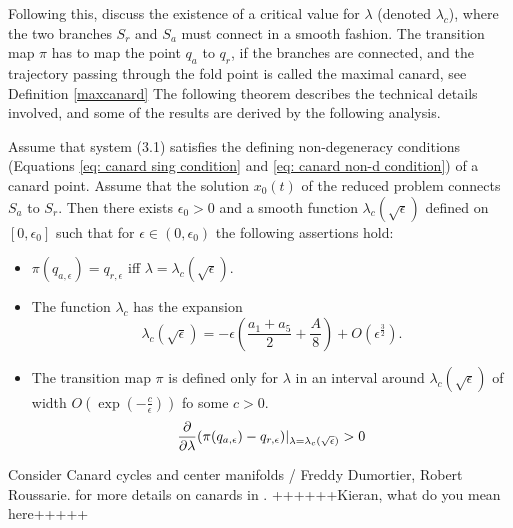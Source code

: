 Following this, \citet{krupa2001} discuss the existence of a critical value for $\lambda$ (denoted $\lambda_c$), where the two branches $S_r$ and $S_a$ must connect in a smooth fashion.  
The transition map $\pi$ has to map the point $q_a$ to $q_r$, if the branches are connected, and the trajectory passing through the fold point is called the maximal canard, see Definition \ref{maxcanard}
The following theorem describes the technical details involved, and some of the results are derived by the following analysis.
\begin{theorem}
	Assume that system (3.1) satisfies the defining non-degeneracy conditions (Equations \ref{eq: canard sing condition} and \ref{eq: canard non-d condition}) of a canard point. Assume that the solution $ x_0(t) $ of the reduced problem connects $ S_a $ to $ S_r $. Then there exists $ \epsilon_0 > 0 $ and a smooth function $\lambda_c(\sqrt{\epsilon})$ defined on $ [0, \epsilon_0] $ such that for $\epsilon \in (0, \epsilon_0)$ the following assertions hold:
	\begin{itemize}
		\item $ \pi(q_{a,\epsilon})=q_{r,\epsilon} $ iff $ \lambda=\lambda_c(\sqrt{\epsilon}) $.\\
		\item The function $ \lambda_c $ has the expansion
		 \begin{equation*}
			\lambda_c(\sqrt{\epsilon})=-\epsilon(\frac{a_1+a_5}{2}+\frac{A}{8})+O(\epsilon^\frac{3}{2}).
			\end{equation*}
			\item The transition map $\pi$ is defined only for $\lambda$ in an interval around $ \lambda_c(\sqrt{\epsilon}) $ of width $ O(\exp(-\frac{c}{\epsilon})) $ fo some $ c>0 $.
			$$ \pd{}{\lambda}(\pi(q_{a,\epsilon})-q_{r,\epsilon})|_{\lambda=\lambda_c(\sqrt{\epsilon})}>0  $$
		
	\end{itemize}
\label{Theorem 3.1}
\end{theorem}
Consider Canard cycles and center manifolds / Freddy Dumortier, Robert Roussarie. for more details on canards in \vdp. ++++++Kieran, what do you mean here+++++




